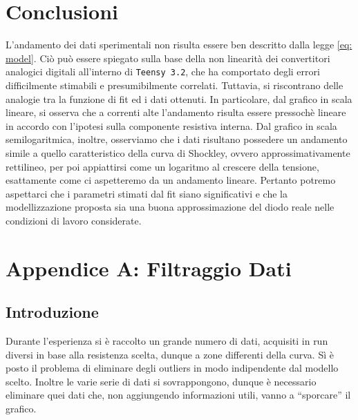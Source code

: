 \documentclass{article}[a4paper, oneside, 11pt]
\begin{document}
\section{Conclusioni}
L'andamento dei dati sperimentali non risulta essere ben descritto dalla legge
\eqref{eq: model}. Ciò può essere spiegato sulla base della non linearità dei
convertitori analogici digitali all'interno di \verb+Teensy 3.2+, che ha 
comportato
degli errori difficilmente stimabili e presumibilmente correlati. Tuttavia, si
riscontrano delle analogie tra la funzione di fit ed i dati ottenuti. In
particolare, dal grafico in scala lineare, si osserva che a correnti alte
l'andamento risulta essere pressoch\`e lineare in accordo con l'ipotesi sulla
componente resistiva interna. Dal grafico in scala semilogaritmica, inoltre, osserviamo
che i dati risultano possedere un andamento simile a quello caratteristico 
della curva di Shockley, ovvero approssimativamente rettilineo, per poi appiattirsi come un logaritmo al crescere
della tensione, esattamente come ci aspetteremo da un andamento lineare.
Pertanto potremo aspettarci che i parametri stimati dal fit siano significativi e che la modellizzazione proposta sia una buona approssimazione del diodo reale nelle condizioni di lavoro considerate.

\section{Appendice A: Filtraggio Dati}\label{app: A}

\subsection{Introduzione}
Durante l’esperienza si è raccolto un grande numero di dati, acquisiti in
run diversi in base alla resistenza scelta, dunque a zone differenti della
curva. Sì è posto il problema di eliminare degli outliers in modo
indipendente dal modello scelto. Inoltre le varie serie di dati si
sovrappongono, dunque è necessario eliminare quei dati che, non aggiungendo
informazioni utili, vanno a “sporcare” il grafico.
\end{document}
